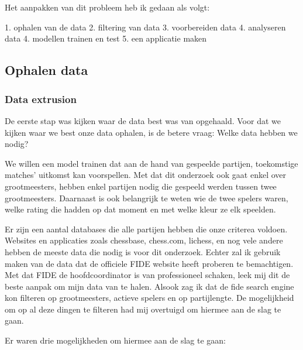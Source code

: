 
\chapter{}
\label{ch:methodologie}

Het aanpakken van dit probleem heb ik gedaan als volgt: 

1. ophalen van de data
2. filtering van data
3. voorbereiden data 
4. analyseren data
4. modellen trainen en test
5. een applicatie maken

\section{Ophalen data}

\subsection{Data extrusion}

De eerste stap was kijken waar de data best was van opgehaald. Voor dat we kijken waar we best onze data ophalen, is de betere vraag: Welke data hebben we nodig? 

We willen een model trainen dat aan de hand van gespeelde partijen, toekomstige matches' uitkomst kan voorspellen. Met dat dit onderzoek ook gaat enkel over grootmeesters, hebben enkel partijen nodig die gespeeld werden tussen twee grootmeesters. Daarnaast is ook belangrijk te weten wie de twee spelers waren, welke rating die hadden op dat moment en met welke kleur ze elk speelden.

Er zijn een aantal databases die alle partijen hebben die onze criterea voldoen. Websites en applicaties zoals chessbase, chess.com, lichess, en nog vele andere hebben de meeste data die nodig is voor dit onderzoek. Echter zal ik gebruik maken van de data dat de officiele FIDE website heeft proberen te bemachtigen. Met dat FIDE de hoofdcoordinator is van professioneel schaken, leek mij dit de beste aanpak om mijn data van te halen. Alsook zag ik dat de fide search engine kon filteren op grootmeesters, actieve spelers en op partijlengte. De mogelijkheid om op al deze dingen te filteren had mij overtuigd om hiermee aan de slag te gaan. 

Er waren drie mogelijkheden om hiermee aan de slag te gaan:

